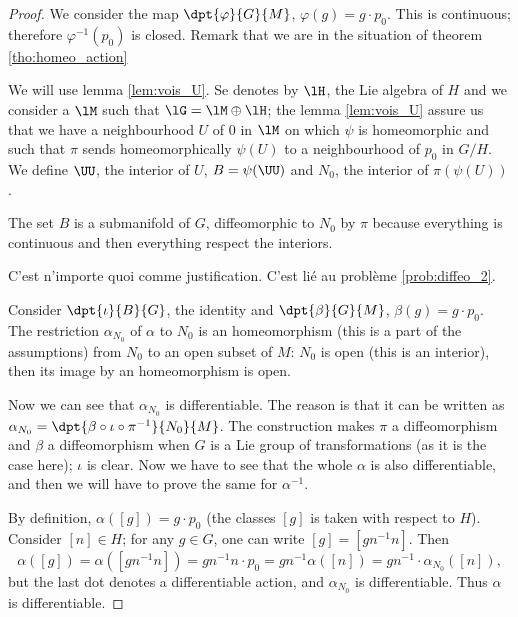 \begin{proof}
We consider the map $\dpt{\varphi}{G}{M}$, $\varphi(g)=g\cdot p_0$. This is continuous; therefore $\varphi^{-1}(p_0)$ is closed. Remark that we are in the situation of theorem \ref{tho:homeo_action} 

We will use lemma \ref{lem:vois_U}. Se denotes by $\lH$, the Lie algebra of $H$ and we consider a $\lM$ such that $\lG=\lM\oplus\lH$; the lemma \ref{lem:vois_U} assure us that we have a neighbourhood $U$ of $0$ in $\lM$ on which $\psi$ is homeomorphic and such that $\pi$ sends homeomorphically $\psi(U)$ to a neighbourhood of $p_0$ in $G/H$. We define $\UU$, the interior of $U$, $B=\psi(\UU)$ and $N_0$, the interior of $\pi(\psi(U))$.

The set $B$ is a submanifold of $G$, diffeomorphic to $N_0$ by $\pi$ because everything is continuous and then everything respect the interiors.
 
\begin{probleme}
C'est n'importe quoi comme justification. C'est lié au problème \ref{prob:diffeo_2}.
\label{prob:diffeo_1}
\end{probleme}
 
Consider $\dpt{\iota}{B}{G}$, the identity and $\dpt{\beta}{G}{M}$, $\beta(g)=g\cdot p_0$. The restriction $\alpha_{N_0}$ of $\alpha$ to $N_0$ is an homeomorphism (this is a part of the assumptions) from $N_0$ to an open subset of $M$: $N_0$ is open (this is an interior), then its image by an homeomorphism is open.

Now we can see that $\alpha_{N_0}$ is differentiable. The reason is that it can be written as $\alpha_{N_0}=\dpt{\beta\circ\iota\circ\pi^{-1}}{N_0}{M}$. The construction makes $\pi$ a diffeomorphism and $\beta$ a diffeomorphism when $G$ is a Lie group of transformations (as it is the case here); $\iota$ is clear. Now we have to see that the whole $\alpha$ is also differentiable, and then we will have to prove the same for $\alpha^{-1}$.

By definition, $\alpha([g])=g\cdot p_0$ (the classes $[g]$ is taken with respect to $H$). Consider $[n]\in H$; for any $g\in G$, one can write $[g]=[gn^{-1} n]$. Then
\begin{equation}
  \alpha([g])=\alpha([gn^{-1} n])
             =gn^{-1} n\cdot p_0
	     =gn^{-1}\alpha([n])
	     =gn^{-1}\cdot\alpha_{N_0}([n]),
\end{equation}
but the last dot denotes a differentiable action, and $\alpha_{N_0}$ is differentiable. Thus $\alpha$ is differentiable.


\end{proof}
